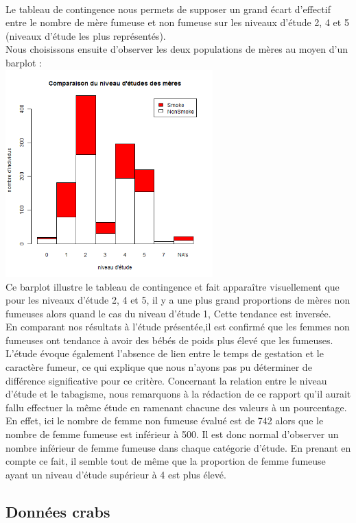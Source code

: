﻿\documentclass[a4paper, 9pt]{article}
\begin{document}
\\Le tableau de contingence nous permets de supposer un grand écart d’effectif entre le nombre de mère fumeuse et non fumeuse sur les niveaux d'étude 2, 4 et 5 (niveaux d’étude les plus représentés).
\\
Nous choisissons ensuite d’observer les deux populations de m\`eres au moyen d'un barplot :\\
\includegraphics[height = 8cm, width = 8cm]{plots/barplot_etude_smoke.png}\\
Ce barplot illustre le tableau de contingence et fait apparaître visuellement que pour les niveaux d'\'etude 2, 4 et 5, il y a une plus grand proportions de
m\`eres non fumeuses alors quand le cas du niveau d'\'etude 1, Cette tendance est inversée.\\
En comparant nos résultats à l'\'etude pr\'esent\'ee,il est confirmé que les femmes non fumeuses ont tendance à avoir des bébés de poids plus élevé que les fumeuses.\\
L’étude évoque également l’absence de lien entre le temps de gestation et le caractère fumeur, ce qui explique que nous n’ayons pas pu déterminer de différence significative pour ce critère.
Concernant la relation entre le niveau d'\'etude et le tabagisme, nous remarquons à la rédaction de ce rapport qu’il aurait fallu effectuer la même étude en ramenant chacune des valeurs à un pourcentage. En effet, ici le nombre de femme non fumeuse évalué est de 742 alors que le nombre de femme fumeuse est inférieur à 500. Il est donc normal d’observer un nombre inférieur de femme fumeuse dans chaque catégorie d’étude. En prenant en compte ce fait, il semble tout de même que la proportion de femme fumeuse ayant un niveau d’étude supérieur à 4 est plus élevé.
\newpage
\subsection{Données crabs}
\end{document}
